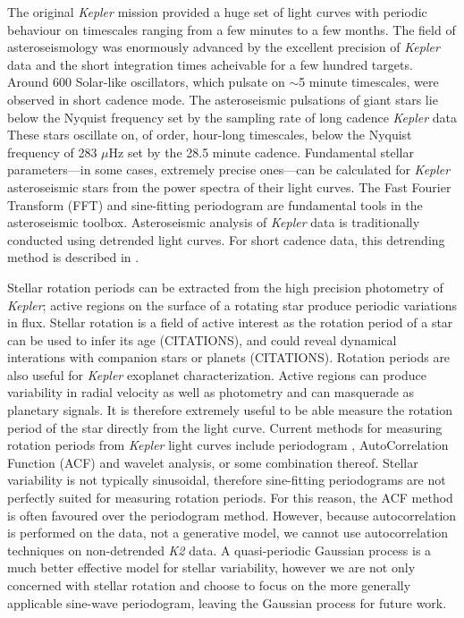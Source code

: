 \documentclass[useAMS, usenatbib]{aastex}
\begin{document}
The original {\it Kepler} mission provided a huge set of  light curves with
periodic behaviour on timescales ranging from a few minutes to a few months.
The field of asteroseismology was enormously advanced by the excellent
precision of {\it Kepler} data and the short integration times acheivable for
a few hundred targets.
Around 600 Solar-like oscillators, which pulsate on $\sim$5 minute timescales,
were observed in short cadence mode.
The asteroseismic pulsations of giant stars lie below the Nyquist frequency set
by the sampling rate of long cadence {\it Kepler} data
These stars oscillate on, of order, hour-long timescales, below the Nyquist
frequency of 283 $\mu$Hz set by the 28.5 minute cadence.
Fundamental stellar parameters---in some cases, extremely precise ones---can
be calculated for {\it Kepler} asteroseismic stars from the power spectra of
their light curves.
The Fast Fourier Transform (FFT) and sine-fitting periodogram are fundamental
tools in the asteroseismic toolbox.
Asteroseismic analysis of {\it Kepler} data is traditionally conducted using
detrended light curves.
For short cadence data, this detrending method is described in
\citet{Garcia2011}.

Stellar rotation periods can be extracted from the high precision photometry
of {\it Kepler}; active regions on the surface of a rotating star produce
periodic variations in flux.
Stellar rotation is a field of active interest as the rotation period of
a star can be used to infer its age (CITATIONS), and could reveal dynamical
interations with companion stars or planets (CITATIONS).
Rotation periods are also useful for {\it Kepler} exoplanet characterization.
Active regions can produce variability in radial velocity as well as
photometry and can masquerade as planetary signals.
It is therefore extremely useful to be able measure the rotation period of the
star directly from the light curve.
Current methods for measuring rotation periods from {\it Kepler} light curves
include periodogram \citep[e.g.][]{Reinhold2013}, AutoCorrelation Function
(ACF) \citep{McQuillan2013} and wavelet \citep[e.g.][]{Garcia2014} analysis,
or some combination thereof.
Stellar variability is not typically sinusoidal, therefore sine-fitting
periodograms are not perfectly suited for measuring rotation periods.
For this reason, the ACF method is often favoured over the periodogram method.
However, because autocorrelation is performed on the data, not a generative
model, we cannot use autocorrelation techniques on non-detrended {\it K2} data.
A quasi-periodic Gaussian process is a much better effective model for stellar
variability, however we are not only concerned with stellar rotation and choose
to focus on the more generally applicable sine-wave periodogram, leaving the
Gaussian process for future work.
\end{document}
